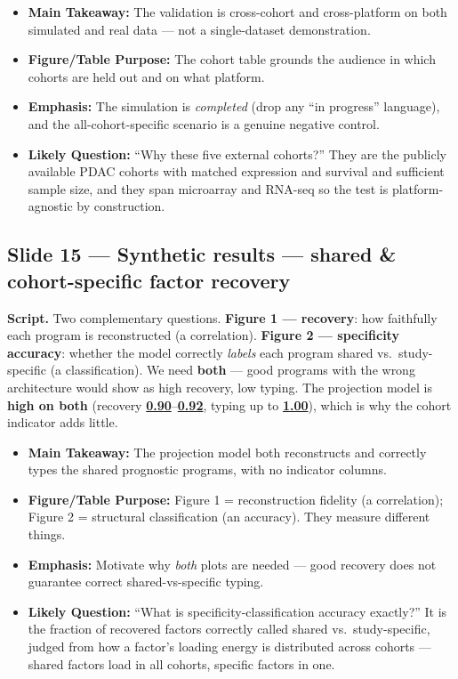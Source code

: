 \documentclass[11pt]{article}
\newcommand{\scriptlabel}{\textbf{Script. }}
\newcommand{\sectionlabel}[1]{\textbf{#1}}
\newcommand{\key}[1]{\textcolor{keyblue}{\textbf{#1}}}        %
\newcommand{\num}[1]{\textcolor{keycar}{\textbf{\uline{#1}}}} %
\begin{document}
\begin{itemize}
\item \sectionlabel{Main Takeaway:} The validation is cross-cohort and cross-platform on both
simulated and real data --- not a single-dataset demonstration.
\item \sectionlabel{Figure/Table Purpose:} The cohort table grounds the audience in which cohorts
are held out and on what platform.
\item \sectionlabel{Emphasis:} The simulation is \emph{completed} (drop any ``in progress''
language), and the all-cohort-specific scenario is a genuine negative control.
\item \sectionlabel{Likely Question:} ``Why these five external cohorts?'' They are the publicly
available PDAC cohorts with matched expression and survival and sufficient sample size, and they
span microarray and RNA-seq so the test is platform-agnostic by construction.
\end{itemize}

\subsection*{Slide 15 --- Synthetic results --- shared \& cohort-specific factor recovery}
\scriptlabel Two complementary questions. \key{Figure 1 --- recovery}: how faithfully each program is
reconstructed (a correlation). \key{Figure 2 --- specificity accuracy}: whether the model correctly
\emph{labels} each program shared vs.\ study-specific (a classification). We need \key{both} ---
good programs with the wrong architecture would show as high recovery, low typing. The projection
model is \key{high on both} (recovery \num{0.90}--\num{0.92}, typing up to \num{1.00}), which is why
the cohort indicator adds little.

\begin{itemize}
\item \sectionlabel{Main Takeaway:} The projection model both reconstructs and correctly types the
shared prognostic programs, with no indicator columns.
\item \sectionlabel{Figure/Table Purpose:} Figure 1 = reconstruction fidelity (a correlation);
Figure 2 = structural classification (an accuracy). They measure different things.
\item \sectionlabel{Emphasis:} Motivate why \emph{both} plots are needed --- good recovery does not
guarantee correct shared-vs-specific typing.
\item \sectionlabel{Likely Question:} ``What is specificity-classification accuracy exactly?'' It is
the fraction of recovered factors correctly called shared vs.\ study-specific, judged from how a
factor's loading energy is distributed across cohorts --- shared factors load in all cohorts,
specific factors in one.
\end{itemize}
\end{document}
